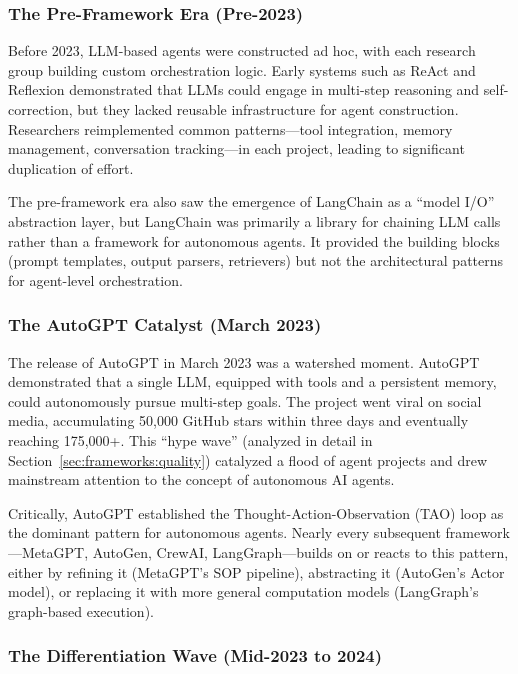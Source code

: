 \subsubsection{The Pre-Framework Era (Pre-2023)}

Before 2023, LLM-based agents were constructed ad hoc, with each research group building custom orchestration logic. Early systems such as ReAct and Reflexion demonstrated that LLMs could engage in multi-step reasoning and self-correction, but they lacked reusable infrastructure for agent construction. Researchers reimplemented common patterns---tool integration, memory management, conversation tracking---in each project, leading to significant duplication of effort.

The pre-framework era also saw the emergence of LangChain as a ``model I/O'' abstraction layer, but LangChain was primarily a library for chaining LLM calls rather than a framework for autonomous agents. It provided the building blocks (prompt templates, output parsers, retrievers) but not the architectural patterns for agent-level orchestration.

\subsubsection{The AutoGPT Catalyst (March 2023)}

The release of AutoGPT in March 2023 was a watershed moment. AutoGPT demonstrated that a single LLM, equipped with tools and a persistent memory, could autonomously pursue multi-step goals. The project went viral on social media, accumulating 50,000 GitHub stars within three days and eventually reaching 175,000+. This ``hype wave'' (analyzed in detail in Section~\ref{sec:frameworks:quality}) catalyzed a flood of agent projects and drew mainstream attention to the concept of autonomous AI agents.

Critically, AutoGPT established the Thought-Action-Observation (TAO) loop as the dominant pattern for autonomous agents. Nearly every subsequent framework---MetaGPT, AutoGen, CrewAI, LangGraph---builds on or reacts to this pattern, either by refining it (MetaGPT's SOP pipeline), abstracting it (AutoGen's Actor model), or replacing it with more general computation models (LangGraph's graph-based execution).

\subsubsection{The Differentiation Wave (Mid-2023 to 2024)}

